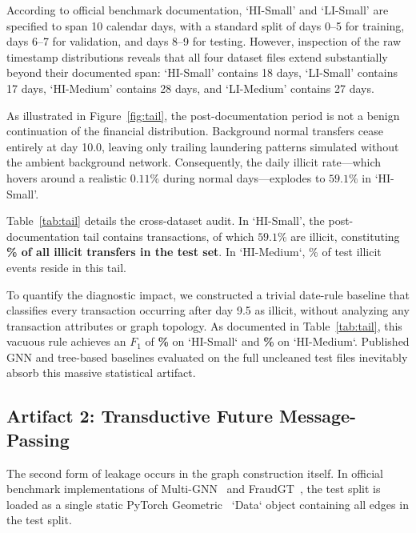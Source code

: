 \documentclass[10pt,twocolumn,letterpaper]{article}
\begin{document}
According to official benchmark documentation, `HI-Small' and `LI-Small' are specified to span 10 calendar days, with a standard split of days 0--5 for training, days 6--7 for validation, and days 8--9 for testing. However, inspection of the raw timestamp distributions reveals that all four dataset files extend substantially beyond their documented span: `HI-Small' contains 18 days, `LI-Small' contains 17 days, `HI-Medium' contains 28 days, and `LI-Medium' contains 27 days.

As illustrated in Figure~\ref{fig:tail}, the post-documentation period is not a benign continuation of the financial distribution. Background normal transfers cease entirely at day 10.0, leaving only trailing laundering patterns simulated without the ambient background network. Consequently, the daily illicit rate—which hovers around a realistic $0.11\%$ during normal days—explodes to $59.1\%$ in `HI-Small'.

\begin{table}[t]
\centering
\small
\caption{\textbf{Cross-Dataset Tail Leakage Audit across IBM AMLworld Suites.} Comparison of actual days in file versus documented span, tail event counts, illicit concentration, share of test illicit volume, and the performance of a trivial date-rule heuristic against published benchmarks.}
\label{tab:tail}
\resizebox{\textwidth}{!}{%
%
}
\end{table}

Table~\ref{tab:tail} details the cross-dataset audit. In `HI-Small', the post-documentation tail contains \TailHISmallEvents{} transactions, of which $59.1\%$ are illicit, constituting \textbf{\TailHISmallShare{}\% of all illicit transfers in the test set}. In `HI-Medium`, \TailHIMediumShare{}\% of test illicit events reside in this tail. 

To quantify the diagnostic impact, we constructed a trivial date-rule baseline that classifies every transaction occurring after day 9.5 as illicit, without analyzing any transaction attributes or graph topology. As documented in Table~\ref{tab:tail}, this vacuous rule achieves an $F_1$ of \textbf{\TailHISmallFone{}\%} on `HI-Small` and \textbf{\TailHIMediumFone{}\%} on `HI-Medium`. Published GNN and tree-based baselines evaluated on the full uncleaned test files inevitably absorb this massive statistical artifact.

\subsection{Artifact 2: Transductive Future Message-Passing}
The second form of leakage occurs in the graph construction itself. In official benchmark implementations of Multi-GNN~\cite{egressy2024multigraph} and FraudGT~\cite{lin2024fraudgt}, the test split is loaded as a single static PyTorch Geometric~\cite{fey2019pyg} `Data` object containing all edges in the test split. 
\end{document}
